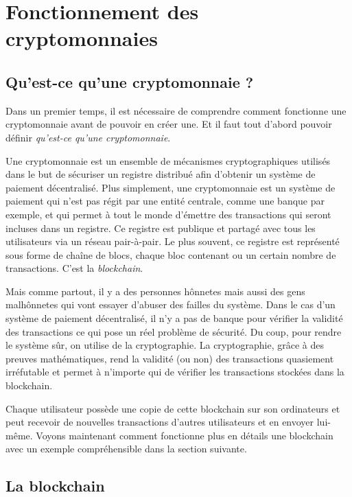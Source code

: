 \chapter{Fonctionnement des cryptomonnaies}
\label{ch:presentation}

\section{Qu'est-ce qu'une cryptomonnaie ?}

Dans un premier temps, il est nécessaire de comprendre comment fonctionne une cryptomonnaie avant de pouvoir en créer une. Et il faut tout d'abord pouvoir définir \emph{qu'est-ce qu'une cryptomonnaie}.

Une cryptomonnaie est un ensemble de mécanismes cryptographiques utilisés dans le but de sécuriser un registre distribué afin d'obtenir un système de paiement décentralisé. Plus simplement, une cryptomonnaie est un système de paiement qui n'est pas régit par une entité centrale, comme une banque par exemple, et qui permet à tout le monde d'émettre des transactions qui seront incluses dans un registre. Ce registre est publique et partagé avec tous les utilisateurs via un réseau pair-à-pair. Le plus souvent, ce registre est représenté sous forme de chaîne de blocs, chaque bloc contenant ou un certain nombre de transactions. C'est la \emph{blockchain}. 

Mais comme partout, il y a des personnes hônnetes mais aussi des gens malhônnetes qui vont essayer d'abuser des failles du système. Dans le cas d'un système de paiement décentralisé, il n'y a pas de banque pour vérifier la validité des transactions ce qui pose un réel problème de sécurité. Du coup, pour rendre le système sûr, on utilise de la cryptographie. La cryptographie, grâce à des preuves mathématiques, rend la validité (ou non) des transactions quasiement irréfutable et permet à n'importe qui de vérifier les transactions stockées dans la blockchain.

Chaque utilisateur possède une copie de cette blockchain sur son ordinateurs et peut recevoir de nouvelles transactions d'autres utilisateurs et en envoyer lui-même. Voyons maintenant comment fonctionne plus en détails une blockchain avec un exemple compréhensible dans la section suivante.

\section{La blockchain}

